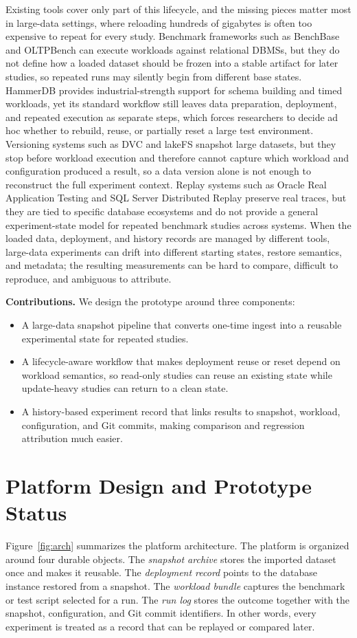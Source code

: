 \documentclass[runningheads]{llncs}
\begin{document}
Existing tools cover only part of this lifecycle, and the missing pieces matter most in large-data settings, where reloading hundreds of gigabytes is often too expensive to repeat for every study. Benchmark frameworks such as BenchBase and OLTPBench can execute workloads against relational DBMSs, but they do not define how a loaded dataset should be frozen into a stable artifact for later studies, so repeated runs may silently begin from different base states. HammerDB provides industrial-strength support for schema building and timed workloads, yet its standard workflow still leaves data preparation, deployment, and repeated execution as separate steps, which forces researchers to decide ad hoc whether to rebuild, reuse, or partially reset a large test environment. Versioning systems such as DVC and lakeFS snapshot large datasets, but they stop before workload execution and therefore cannot capture which workload and configuration produced a result, so a data version alone is not enough to reconstruct the full experiment context. Replay systems such as Oracle Real Application Testing and SQL Server Distributed Replay preserve real traces, but they are tied to specific database ecosystems and do not provide a general experiment-state model for repeated benchmark studies across systems. When the loaded data, deployment, and history records are managed by different tools, large-data experiments can drift into different starting states, restore semantics, and metadata; the resulting measurements can be hard to compare, difficult to reproduce, and ambiguous to attribute.

\noindent\textbf{Contributions.} We design the prototype around three components:
\begin{itemize}
  \item A large-data snapshot pipeline that converts one-time ingest into a reusable experimental state for repeated studies.
  \item A lifecycle-aware workflow that makes deployment reuse or reset depend on workload semantics, so read-only studies can reuse an existing state while update-heavy studies can return to a clean state.
  \item A history-based experiment record that links results to snapshot, workload, configuration, and Git commits, making comparison and regression attribution much easier.
\end{itemize}

\section{Platform Design and Prototype Status}
Figure~\ref{fig:arch} summarizes the platform architecture. The platform is organized around four durable objects. The \emph{snapshot archive} stores the imported dataset once and makes it reusable. The \emph{deployment record} points to the database instance restored from a snapshot. The \emph{workload bundle} captures the benchmark or test script selected for a run. The \emph{run log} stores the outcome together with the snapshot, configuration, and Git commit identifiers. In other words, every experiment is treated as a record that can be replayed or compared later.
\end{document}

